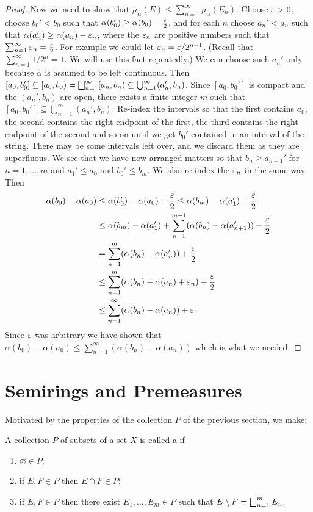 \begin{proof}
Now we need to show that $\mu_\alpha(E)\leq\sum_{n=1}^\infty\mu_\alpha(E_n)$. Choose $\varepsilon>0$, choose $b_0'<b_0$ such that $\alpha(b_0')\geq\alpha(b_0)-\frac{\varepsilon}2$, and for each $n$ choose $a_n'<a_n$ such that $\alpha(a_n')\geq\alpha(a_n)-\varepsilon_n$, where the $\varepsilon_n$ are positive numbers such that $\sum_{n=1}^\infty\varepsilon_n=\frac{\varepsilon}2$. For example we could let $\varepsilon_n=\varepsilon/2^{n+1}$. (Recall that $\sum_{n=1}^\infty 1/2^n=1$. We will use this fact repeatedly.) We can choose such $a_n'$ only because $\alpha$ is assumed to be left continuous. Then $[a_0,b_0']\subseteq[a_0,b_0)=\bigsqcup_{n=1}^\infty[a_n,b_n)\subseteq\bigcup_{n=1}^\infty(a_n',b_n)$. Since $[a_0,b_0']$ is compact and the $(a_n',b_n)$ are open, there exists a finite integer $m$ such that $[a_0,b_0']\subseteq\bigcup_{n=1}^m(a_n',b_n)$. Re-index the intervals so that the first contains $a_0$, the second contains the right endpoint of the first, the third contains the right endpoint of the second and so on until we get $b_0'$ contained in an interval of the string. There may be some intervals left over, and we discard them as they are superfluous. We see that we have now arranged matters so that $b_n\geq a_{n+1}'$ for $n=1,\dots,m$ and $a_1'\leq a_0$ and $b_0'\leq b_m$. We also re-index the $\varepsilon_n$ in the same way. Then
\begin{align*}
    \alpha(b_0)-\alpha(a_0)&\leq\alpha(b_0')-\alpha(a_0)+\frac{\varepsilon}2\leq\alpha(b_m)-\alpha(a_1')+\frac{\varepsilon}2\\
    &\leq\alpha(b_m)-\alpha(a_1')+\sum_{n=1}^{m-1}(\alpha(b_n)-\alpha(a_{n+1}'))+\frac{\varepsilon}2\\
    &=\sum_{n=1}^m(\alpha(b_n)-\alpha(a_n'))+\frac{\varepsilon}2\\
    &\leq\sum_{n=1}^m(\alpha(b_n)-\alpha(a_n)+\varepsilon_n)+\frac{\varepsilon}2\\
    &\leq\sum_{n=1}^\infty(\alpha(b_n)-\alpha(a_n))+\varepsilon.
\end{align*}Since $\varepsilon$ was arbitrary we have shown that $\alpha(b_0)-\alpha(a_0)\leq\sum_{n=1}^\infty(\alpha(b_n)-\alpha(a_n))$ which is what we needed.
\end{proof}

\section{Semirings and Premeasures}

Motivated by the properties of the collection $P$ of the previous section, we make:

\begin{definition}
A collection $P$ of subsets of a set $X$ is called a  if
\begin{enumerate}[label=\arabic*)]
    \item $\varnothing\in P$;
    \item if $E,F\in P$ then $E\cap F\in P$;
    \item if $E,F\in P$ then there exist $E_1,\dots,E_m\in P$ such that $E\setminus F=\bigsqcup_{n=1}^mE_n$.
\end{enumerate}
\end{definition}

